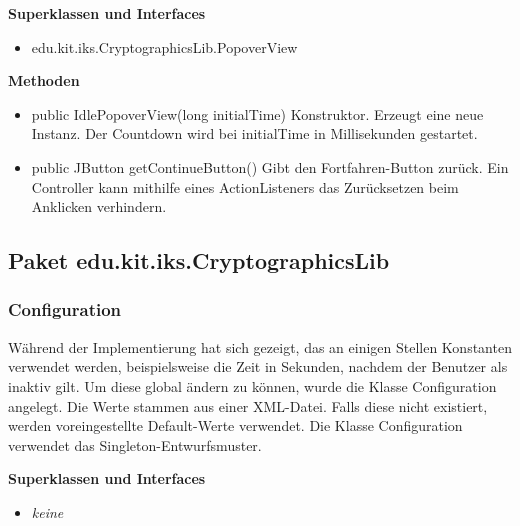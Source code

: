 \documentclass{article}
\begin{document}
    \textbf{Superklassen und Interfaces}
      \begin{itemize}
        \item edu.kit.iks.CryptographicsLib.PopoverView
      \end{itemize}
           
    \textbf{Methoden}
      \begin{itemize}
        \item public IdlePopoverView(long initialTime)\newline
              Konstruktor. Erzeugt eine neue Instanz. Der Countdown wird bei initialTime in Millisekunden
              gestartet.
        \item public JButton getContinueButton()\newline
              Gibt den Fortfahren-Button zurück. Ein Controller kann mithilfe eines ActionListeners
              das Zurücksetzen beim Anklicken verhindern.
      \end{itemize}

  \subsection{Paket edu.kit.iks.CryptographicsLib}
    \subsubsection{Configuration}
    Während der Implementierung hat sich gezeigt, das an einigen Stellen Konstanten verwendet werden,
    beispielsweise die Zeit in Sekunden, nachdem der Benutzer als inaktiv gilt. Um diese global ändern zu können,
    wurde die Klasse Configuration angelegt. Die Werte stammen aus einer XML-Datei. Falls diese nicht existiert,
    werden voreingestellte Default-Werte verwendet. Die Klasse Configuration verwendet das Singleton-Entwurfsmuster.\newline

    \textbf{Superklassen und Interfaces}
      \begin{itemize}
        \item \textit{keine}
      \end{itemize}
           
\end{document}
